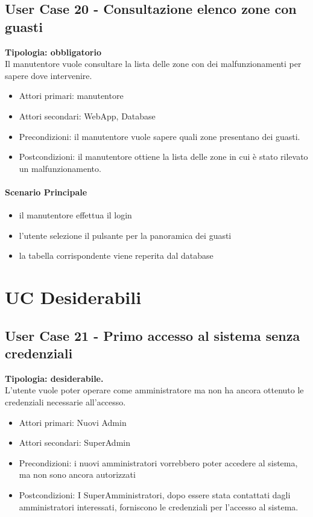 \documentclass[12pt]{article}
\begin{document}
\subsection{User Case 20 - Consultazione elenco zone con guasti}
\textbf{Tipologia: obbligatorio}\\
Il manutentore vuole consultare la lista delle zone con dei malfunzionamenti per sapere dove intervenire.
\begin{itemize}
	\item Attori primari: manutentore
	\item Attori secondari: WebApp, Database
	\item Precondizioni: il manutentore vuole sapere quali zone presentano dei guasti.\\
	\item Postcondizioni: il manutentore ottiene la lista delle zone in cui è stato rilevato un malfunzionamento.
\end{itemize}
\paragraph{Scenario Principale}
\begin{itemize}
	\item il manutentore effettua il login
	\item l'utente selezione il pulsante per la panoramica dei guasti
	\item la tabella corrispondente viene reperita dal database
\end{itemize}


\section{UC Desiderabili}

\subsection{User Case 21 - Primo accesso al sistema senza credenziali}
\textbf{Tipologia: desiderabile.} \\
L'utente vuole poter operare come amministratore ma non ha ancora ottenuto le credenziali necessarie all'accesso.
\begin{itemize}
	\item Attori primari: Nuovi Admin
	\item Attori secondari: SuperAdmin
	\item Precondizioni: i nuovi amministratori vorrebbero poter accedere al sistema, ma non sono ancora autorizzati
	\item Postcondizioni: I SuperAmministratori, dopo essere stata contattati dagli amministratori interessati, forniscono le credenziali per l'accesso al sistema.
\end{itemize}
\end{document}

